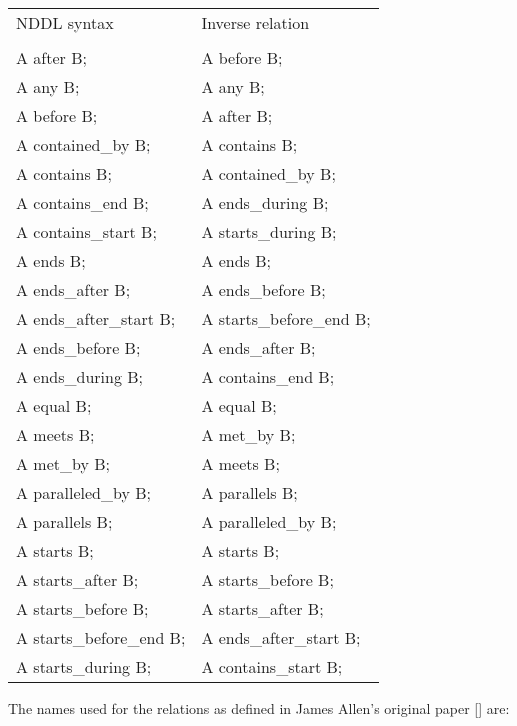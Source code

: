 \documentclass[10pt, letterpaper, twoside]{article}
\begin{document}
\begin{tabular}{ll}
NDDL syntax & Inverse relation \\
\cline{1-2} \\
A after B; & A before B; \\
A any B; & A any B; \\
A before B; & A after B; \\
A contained\_by B; & A contains B; \\
A contains B; & A contained\_by B; \\
A contains\_end B; & A ends\_during B; \\
A contains\_start B; & A starts\_during B; \\
A ends B; & A ends B; \\
A ends\_after B; & A ends\_before B; \\
A ends\_after\_start B; & A starts\_before\_end B; \\
A ends\_before B; & A ends\_after B; \\
A ends\_during B; & A contains\_end B; \\
A equal B; & A equal B; \\
A meets B; & A met\_by B; \\
A met\_by B; & A meets B; \\
A paralleled\_by B; & A parallels B; \\
A parallels B; & A paralleled\_by B; \\
A starts B; & A starts B; \\
A starts\_after B; & A starts\_before B; \\
A starts\_before B; & A starts\_after B; \\
A starts\_before\_end B; & A ends\_after\_start B; \\
A starts\_during B; & A contains\_start B; \\
\end{tabular}

The names used for the relations as defined in James Allen's original
paper [] are:
\end{document}

